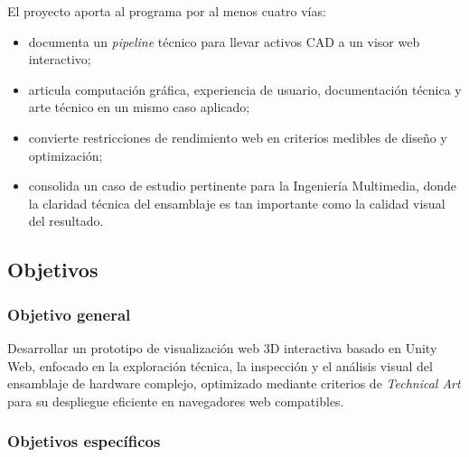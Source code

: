 El proyecto aporta al programa por al menos cuatro vías:

\begin{itemize}
    \item documenta un \textit{pipeline} técnico para llevar activos CAD a un visor web interactivo;
    \item articula computación gráfica, experiencia de usuario, documentación técnica y arte técnico en un mismo caso aplicado;
    \item convierte restricciones de rendimiento web en criterios medibles de diseño y optimización;
    \item consolida un caso de estudio pertinente para la Ingeniería Multimedia, donde la claridad técnica del ensamblaje es tan importante como la calidad visual del resultado.
\end{itemize}

\subsection{Objetivos}

\subsubsection{Objetivo general}

Desarrollar un prototipo de visualización web 3D interactiva basado en Unity Web, enfocado en la exploración técnica, la inspección y el análisis visual del ensamblaje de hardware complejo, optimizado mediante criterios de \textit{Technical Art} para su despliegue eficiente en navegadores web compatibles.

\subsubsection{Objetivos específicos}

